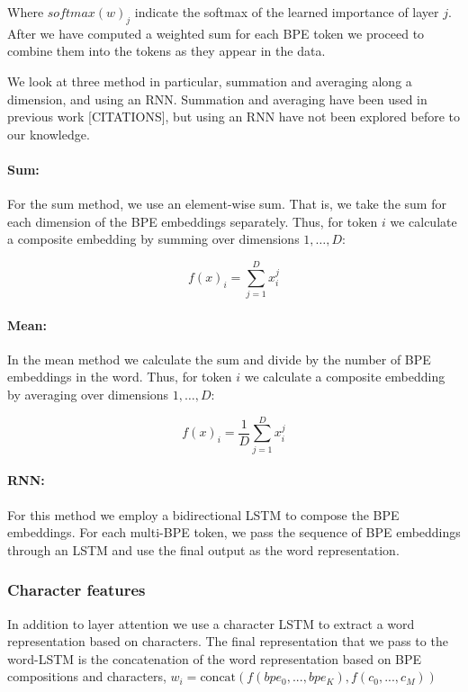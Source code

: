 \documentclass[11pt]{article}
\begin{document}
        Where $softmax(w)_j$ indicate the softmax of the learned
     importance of layer $j$. After we have computed a weighted sum for
     each BPE token we proceed to combine them into the tokens as they
     appear in the data.

            We look at three method in particular, summation and
     averaging along a dimension, and using an RNN. Summation and
     averaging have been used in previous work [CITATIONS], but using
     an RNN have not been explored before to our knowledge.
    
    	\paragraph{Sum:} For the sum method, we use an element-wise
     sum. That is, we take the sum for each dimension of the BPE
     embeddings separately. Thus, for token $i$ we calculate a
     composite embedding by summing over dimensions $1,\ldots,D$:
	
	\begin{equation}
	f(x)_i = \sum_{j=1}^{D} x_i^j
	\end{equation}
	

    	\paragraph{Mean:} In the mean method we calculate the sum and
     divide by the number of BPE embeddings in the word. Thus, for
     token $i$ we calculate a composite embedding by averaging over
     dimensions $1,\ldots,D$:
	
	\begin{equation}
	f(x)_{i} = \frac{1}{D}\sum_{j=1}^{D} x_i^j
	\end{equation}
	
	
	\paragraph{RNN:} For this method we employ a bidirectional LSTM
        to compose the BPE embeddings. For each multi-BPE
        token, we pass the sequence of BPE embeddings through an LSTM
        and use the final output as the word representation. 
    
	\subsubsection{Character features}
    	In addition to layer attention we use a character LSTM to
     extract a word representation based on characters. The final
     representation that we pass to the word-LSTM is the concatenation
     of the word representation based on BPE compositions and
     characters,
     $w_i = \text{concat}(f(bpe_0,...,bpe_K), f(c_0, ..., c_M))$
	
\end{document}
